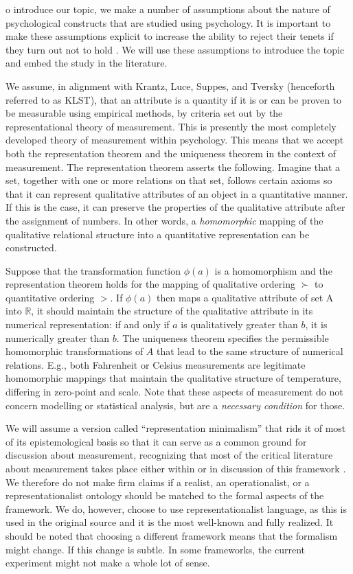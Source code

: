 \documentclass[utf8]{FrontiersinVancouver}
\begin{document}
o introduce our topic, we make a number of assumptions about the nature of psychological constructs that are studied using psychology. It is important to make these assumptions explicit to increase the ability to reject their tenets if they turn out not to hold \citep{meehlTheoreticalRisksTabular2004}. We will use these assumptions to introduce the topic and embed the study in the literature.

We assume, in alignment with Krantz, Luce, Suppes, and Tversky (henceforth referred to as KLST), that an attribute is a quantity if it is or can be proven to be measurable using empirical methods, by criteria set out by the representational theory of measurement\citep{krantzFoundationsMeasurement1971}. This is presently the most completely developed theory of measurement within psychology. This means that we accept both the representation theorem and the uniqueness theorem in the context of measurement. The representation theorem asserts the following. Imagine that a set, together with one or more relations on that set, follows certain axioms so that it can represent qualitative attributes of an object in a quantitative manner. If this is the case, it can preserve the properties of the qualitative attribute after the assignment of numbers. In other words, a \textit{homomorphic} mapping of the qualitative relational structure into a quantitative representation can be constructed. 

Suppose that the transformation function $\phi(a)$ is a homomorphism and the representation theorem holds for the mapping of qualitative ordering $\succ$ to quantitative ordering $>$. If $\phi(a)$ then maps a qualitative attribute of set A into $\mathbb{R}$, it should maintain the structure of the qualitative attribute in its numerical representation: if and only if $a$ is qualitatively greater than $b$, it is numerically greater than $b$. The uniqueness theorem specifies the permissible homomorphic transformations of $A$ that lead to the same structure of numerical relations. E.g., both Fahrenheit or Celsius measurements are legitimate homomorphic mappings that maintain the qualitative structure of temperature, differing in zero-point and scale. Note that these aspects of measurement do not concern modelling or statistical analysis, but are a \textit{necessary condition} for those.

We will assume a version called ``representation minimalism'' that rids it of most of its epistemological basis so that it can serve as a common ground for discussion about measurement, recognizing that most of the critical literature about measurement takes place either within or in discussion of this framework \citep{vessonenRepresentationMeasurement2021}. We therefore do not make firm claims if a realist, an operationalist, or a representationalist ontology should be matched to the formal aspects of the framework. We do, however, choose to use representationalist language, as this is used in the original source and it is the most well-known and fully realized. It should be noted that choosing a different framework means that the formalism might change. If this change is subtle. In some frameworks, the current experiment might not make a whole lot of sense.
\end{document}

